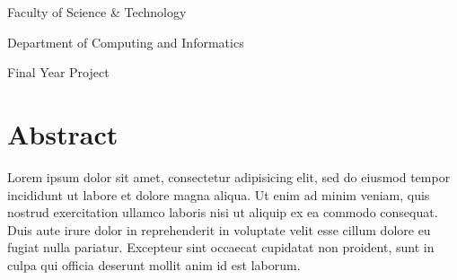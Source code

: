 \documentclass[11pt, twoside]{report}
\begin{document}

\vspace*{\fill}
\begingroup
\centering
Faculty of Science \& Technology

Department of Computing and Informatics

Final Year Project

\endgroup
\vspace*{\fill}

\chapter*{Abstract}
Lorem ipsum dolor sit amet, consectetur adipisicing elit, sed do eiusmod tempor incididunt ut labore et dolore magna aliqua. 
Ut enim ad minim veniam, quis nostrud exercitation ullamco laboris nisi ut aliquip ex ea commodo consequat. 
Duis aute irure dolor in reprehenderit in voluptate velit esse cillum dolore eu fugiat nulla pariatur. 
Excepteur sint occaecat cupidatat non proident, sunt in culpa qui officia deserunt mollit anim id est laborum.
\end{document}
